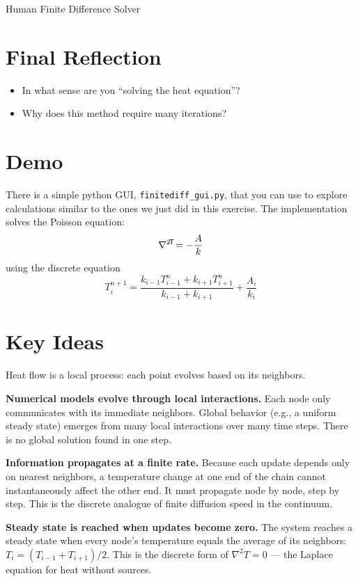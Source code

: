 \begin{activity}{Human Finite Difference Solver}
\section*{Final Reflection}

\begin{itemize}
    \item In what sense are you “solving the heat equation”?
    \item Why does this method require many iterations?
\end{itemize}


\section*{Demo}

There is a simple python GUI, \verb+finitediff_gui.py+, that you can use to explore calculations similar to the ones we just did in this exercise.  The implementation solves the Poisson equation:
\[
    \laplacian \T = - \frac{A}{k}
\]
using the discrete equation
\[
    T_i^{n+1} = 
    \frac{k_{i-1}T_{i-1}^n+k_{i+1}T_{i+1}^n} {k_{i-1}+k_{i+1}} 
    + \frac{A_i}{k_i}
\]


\section*{Key Ideas}

Heat flow is a local process: each point evolves based on its neighbors.

\textbf{Numerical models evolve through local interactions.} Each node only communicates with its immediate neighbors. Global behavior (e.g., a uniform steady state) emerges from many local interactions over many time steps. There is no global solution found in one step.

\textbf{Information propagates at a finite rate.} Because each update depends only on nearest neighbors, a temperature change at one end of the chain cannot instantaneously affect the other end. It must propagate node by node, step by step. This is the discrete analogue of finite diffusion speed in the continuum.

\textbf{Steady state is reached when updates become zero.} The system reaches a steady state when every node's temperature equals the average of its neighbors: $T_i = (T_{i-1} + T_{i+1})/2$. This is the discrete form of $\nabla^2 T = 0$ --- the Laplace equation for heat without sources.

\end{activity}